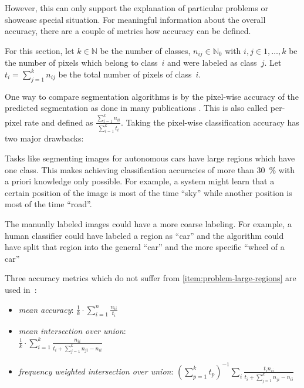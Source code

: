 However, this can only support the explanation of particular problems or
showcase special situation. For meaningful information about the overall
accuracy, there are a couple of metrics how accuracy can be defined.

For this section, let $k \in \mathbb{N}$ be the number of classes, $n_{ij} \in
\mathbb{N}_0$ with $i,j \in 1, \dots, k$ be the number of pixels which belong to
class~$i$ and were labeled as class~$j$. Let $t_i = \sum_{j=1}^k n_{ij}$ be the
total number of pixels of class~$i$.

One way to compare segmentation algorithms is by the pixel-wise accuracy of the
predicted segmentation as done in many publications
\cite{shotton2006textonboost,csurka2008simple,long2014fully}. This is also
called per-pixel rate and defined as $\frac{\sum_{i=1}^k n_{ii}}{\sum_{i=1}^k
t_i}$. Taking the pixel-wise classification accuracy has two major drawbacks:

\begin{problemnr}
    \item \label{item:problem-large-regions} Tasks like segmenting images for
          autonomous cars have large regions which have one class. This makes
          achieving classification accuracies of more than \SI{30}{\percent}
          with a priori knowledge only possible. For example, a system might
          learn that a certain position of the image is most of the time
          \enquote{sky} while another position is most of the time
          \enquote{road}.
    \item \label{item:problem-labeling-granularity} The manually labeled images
          could have a more coarse labeling. For example, a human classifier
          could have labeled a region as
          \enquote{car} and the algorithm could have split that region into
          the general \enquote{car} and the more specific \enquote{wheel of a
          car}
\end{problemnr}
\goodbreak
Three accuracy metrics which do not suffer from
\cref{item:problem-large-regions} are used in~\cite{long2014fully}:\nobreak%
\begin{itemize}
    \item \textit{mean accuracy}: $\frac{1}{k} \cdot \sum_{i=1}^n \frac{n_{ii}}{t_i}$
    \item \textit{mean intersection over union}: \hfill\\$\frac{1}{k} \cdot \sum_{i=1}^k \frac{n_{ii}}{t_i + \sum_{j=1}^k n_{ji}-n_{ii}}$
    \item \textit{frequency weighted intersection over union}:
          ${({\sum_{p=1}^k t_p})}^{-1} \sum_i \frac{t_i n_{ii}}{t_i + \sum_{j=1}^k n_{ji} - n_{ii}}$
\end{itemize}

